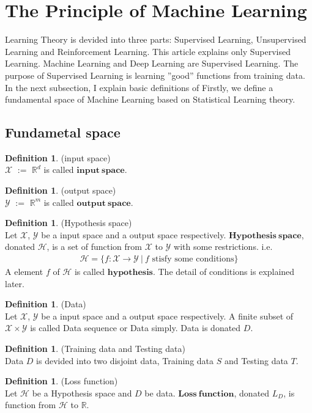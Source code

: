 \documentclass[11pt, a4paper, english, dvipdfmx]{jsarticle}
\theoremstyle{definition}
\newtheorem{Definition+}[Axiom+]{Definition}
\newcommand{\R}{\mathbb{R}}
\newcommand{\X}{\mathcal{X}}
\newcommand{\Y}{\mathcal{Y}}
\newcommand{\Hil}{\mathcal{H}}
\begin{document}
\section{The Principle of Machine Learning}
Learning Theory is devided into three parts: Supervised Learning, Unsupervised Learning and Reinforcement Learning. 
This article explains only Supervised Learning.
Machine Learning and Deep Learning are Supervised Learning. The purpose of Supervised
Learning is learning ''good” functions from training data. In the next subsection, I explain basic definitions of
Firstly, we define a fundamental space of Machine Learning based on Statistical Learning theory.
\subsection{Fundametal space }
\begin{Definition+}(input space)\\
    $\mathcal{X}$ $:=$ $\R^{d}$ is called $\mathbf{input~space}$.
\end{Definition+}
\begin{Definition+}(output space)\\
    $\mathcal{Y}$ $:=$ $\R^{m}$ is called $\mathbf{output~space}$.
\end{Definition+}
\begin{Definition+}(Hypothesis space)\\
      Let $\X$, $\Y$ be a input space and a output space respectively. $\mathbf{Hypothesis~space}$, donated $\Hil$, is a set of function from $\X$ to $\Y$ with some restrictions. i.e.
    \begin{align*}
        \Hil = \{f:\X\to\Y~|~f\text{ stisfy some conditions}\}
    \end{align*}
      A element $f$ of $\Hil$ is called $\mathbf{hypothesis}$. The detail of conditions is explained later.
\end{Definition+}

\begin{Definition+}(Data)\\
    Let $\X$, $\Y$ be a input space and a output space respectively.
    A finite subset of $\X\times\Y$ is called Data sequence or Data simply. Data is donated $D$.
\end{Definition+}

\begin{Definition+}(Training data and Testing data)\\
    Data $D$ is devided into two disjoint data, Training data $S$ and Testing data $T$.
\end{Definition+}
\begin{Definition+}(Loss function)\\
    Let $\Hil$ be a Hypothesis space and $D$ be data. $\mathbf{Loss~function}$, donated $L_{D}$, is function from $\Hil$ to $\R$.
\end{Definition+}
\end{document}
